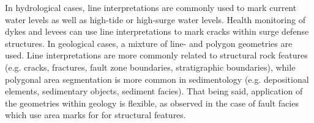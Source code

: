 \documentclass[review]{elsarticle}
\begin{document}

In hydrological cases, line interpretations are commonly used to mark current water levels as well as high-tide or high-surge water levels. Health monitoring of dykes and levees can use line interpretations to mark cracks within surge defense structures. In geological cases, a mixture of line- and polygon geometries are used. Line interpretations are more commonly related to structural rock features (e.g. cracks, fractures, fault zone boundaries, stratigraphic boundaries), while polygonal area segmentation is more common in sedimentology (e.g. depositional elements, sedimentary objects, sediment facies). That being said, application of the geometries within geology is flexible, as observed in the case of fault facies which use area marks for for structural features.

\end{document}
